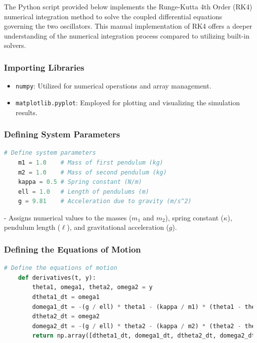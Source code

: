 \documentclass[12pt]{report} %
\begin{document}
    The Python script provided below implements the Runge-Kutta 4th Order (RK4) numerical integration method to solve the coupled differential equations governing the two oscillators. This manual implementation of RK4 offers a deeper understanding of the numerical integration process compared to utilizing built-in solvers.
    
    \subsubsection{Importing Libraries}
    
    \begin{itemize}
        \item \texttt{numpy}: Utilized for numerical operations and array management.
        \item \texttt{matplotlib.pyplot}: Employed for plotting and visualizing the simulation results.
    \end{itemize}
    
    \subsubsection{Defining System Parameters}
    
    \begin{lstlisting}[language=Python, caption={Defining System Parameters}, label={lst:system_parameters}]
    # Define system parameters
    m1 = 1.0    # Mass of first pendulum (kg)
    m2 = 1.0    # Mass of second pendulum (kg)
    kappa = 0.5 # Spring constant (N/m)
    ell = 1.0   # Length of pendulums (m)
    g = 9.81    # Acceleration due to gravity (m/s^2)
    \end{lstlisting}
    
    - Assigns numerical values to the masses (\( m_1 \) and \( m_2 \)), spring constant (\( \kappa \)), pendulum length (\( \ell \)), and gravitational acceleration (\( g \)).
    
    \subsubsection{Defining the Equations of Motion}
    
    \begin{lstlisting}[language=Python, caption={Defining the Equations of Motion}, label={lst:equations_of_motion}]
    # Define the equations of motion
    def derivatives(t, y):
        theta1, omega1, theta2, omega2 = y
        dtheta1_dt = omega1
        domega1_dt = -(g / ell) * theta1 - (kappa / m1) * (theta1 - theta2)
        dtheta2_dt = omega2
        domega2_dt = -(g / ell) * theta2 - (kappa / m2) * (theta2 - theta1)
        return np.array([dtheta1_dt, domega1_dt, dtheta2_dt, domega2_dt])
    \end{lstlisting}
    
\end{document}
